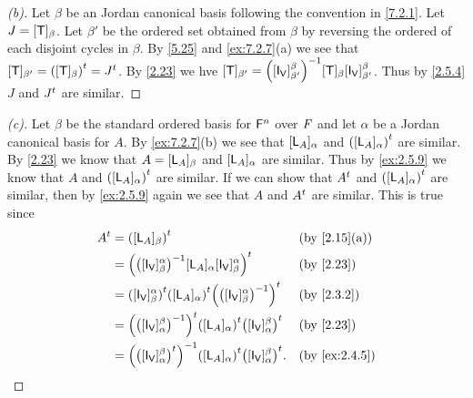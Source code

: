 \begin{proof}[(b)]
  Let \(\beta\) be an Jordan canonical basis following the convention in \cref{7.2.1}.
  Let \(J = [\mathsf{T}]_{\beta}\).
  Let \(\beta'\) be the ordered set obtained from \(\beta\) by reversing the ordered of each disjoint cycles in \(\beta\).
  By \cref{5.25} and \cref{ex:7.2.7}(a) we see that \([\mathsf{T}]_{\beta'} = {([\mathsf{T}]_{\beta})}^{t} = {J}^{t}\).
  By \cref{2.23} we hve \([\T]_{\beta'} = \pa{[\IT[\V]]_{\beta'}^{\beta}}^{-1} [\T]_{\beta} [\IT[\V]]_{\beta'}^{\beta}\).
  Thus by \cref{2.5.4} \(J\) and \({J}^{t}\) are similar.
\end{proof}

\begin{proof}[(c)]
  Let \(\beta\) be the standard ordered basis for \(\mathsf{F}^n\) over \(\mathit{F}\) and let \(\alpha\) be a Jordan canonical basis for \(A\).
  By \cref{ex:7.2.7}(b) we see that \([\mathsf{L}_A]_{\alpha}\) and \({([\mathsf{L}_A]_{\alpha})}^{t}\) are similar.
  By \cref{2.23} we know that \(A = [\mathsf{L}_A]_{\beta}\) and \([\mathsf{L}_A]_{\alpha}\) are similar.
  Thus by \cref{ex:2.5.9} we know that \(A\) and \({([\mathsf{L}_A]_{\alpha})}^{t}\) are similar.
  If we can show that \({A}^{t}\) and \({([\mathsf{L}_A]_{\alpha})}^{t}\) are similar, then by \cref{ex:2.5.9} again we see that \(A\) and \({A}^{t}\) are similar.
  This is true since
  \begin{align*}
    \tp{A} & = \tp{([\L_A]_{\beta})}                                                                                       &  & \by{2.15}[a]  \\
           & = \tp{\pa{\pa{[\IT[\V]]_{\beta}^{\alpha}}^{-1} [\L_A]_{\alpha} [\IT[\V]]_{\beta}^{\alpha}}}                   &  & \by{2.23}     \\
           & = \tp{([\IT[\V]]_{\beta}^{\alpha})} \tp{([\L_A]_{\alpha})} \tp{\pa{\pa{[\IT[\V]]_{\beta}^{\alpha}}^{-1}}}     &  & \by{2.3.2}    \\
           & = \tp{\pa{\pa{[\IT[\V]]_{\alpha}^{\beta}}^{-1}}} \tp{([\L_A]_{\alpha})} \tp{\pa{[\IT[\V]]_{\alpha}^{\beta}}}  &  & \by{2.23}     \\
           & = \pa{\tp{\pa{[\IT[\V]]_{\alpha}^{\beta}}}}^{-1} \tp{([\L_A]_{\alpha})} \tp{\pa{[\IT[\V]]_{\alpha}^{\beta}}}. &  & \by{ex:2.4.5}
  \end{align*}
\end{proof}

